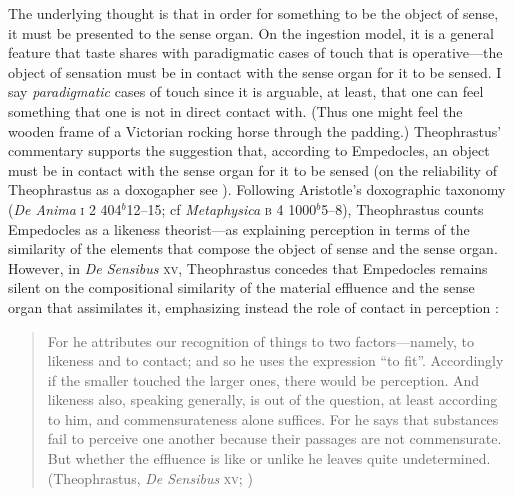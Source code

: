 The underlying thought is that in order for something to be the object of sense, it must be presented to the sense organ. On the ingestion model, it is a general feature that taste shares with paradigmatic cases of touch that is operative---the object of sensation must be in contact with the sense organ for it to be sensed. I say \emph{paradigmatic} cases of touch since it is arguable, at least, that one can feel something that one is not in direct contact with. (Thus one might feel the wooden frame of a Victorian rocking horse through the padding.) Theophrastus' commentary supports the suggestion that, according to Empedocles, an object must be in contact with the sense organ for it to be sensed (on the reliability of Theophrastus as a doxogapher see \citealt{Kahn:1994qf}). Following Aristotle's doxographic taxonomy (\emph{De Anima} \textsc{i} 2 404\( ^{b} \)12--15; cf \emph{Metaphysica} \textsc{b} 4 1000\( ^{b} \)5--8), Theophrastus counts Empedocles as a likeness theorist---as explaining perception in terms of the similarity of the elements that compose the object of sense and the sense organ. However, in \emph{De Sensibus} \textsc{xv}, Theophrastus concedes that Empedocles remains silent on the compositional similarity of the material effluence and the sense organ that assimilates it, emphasizing instead the role of contact in perception \citep{Kamtekar:2009fk,Sedley:1992uq}:
\begin{quote}
	For he attributes our recognition of things to two factors---namely, to likeness and to contact; and so he uses the expression ``to fit''. Accordingly if the smaller touched the larger ones, there would be perception. And likeness also, speaking generally, is out of the question, at least according to him, and commensurateness alone suffices. For he says that substances fail to perceive one another because their passages are not commensurate. But whether the effluence is like or unlike he leaves quite undetermined. (Theophrastus, \emph{De Sensibus} \textsc{xv}; \citealt[79]{Stratton:1917vn})
\end{quote}


